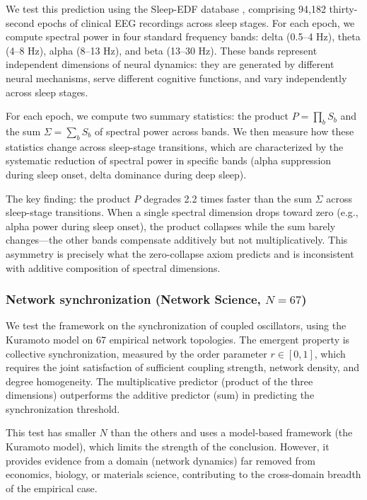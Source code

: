 \documentclass[12pt, a4paper]{article}
\theoremstyle{definition}
\theoremstyle{remark}
\begin{document}
We test this prediction using the Sleep-EDF database \cite{goldberger2000}, comprising 94,182 thirty-second epochs of clinical EEG recordings across sleep stages. For each epoch, we compute spectral power in four standard frequency bands: delta (0.5--4 Hz), theta (4--8 Hz), alpha (8--13 Hz), and beta (13--30 Hz). These bands represent independent dimensions of neural dynamics: they are generated by different neural mechanisms, serve different cognitive functions, and vary independently across sleep stages.

For each epoch, we compute two summary statistics: the product $P = \prod_{b} S_b$ and the sum $\Sigma = \sum_{b} S_b$ of spectral power across bands. We then measure how these statistics change across sleep-stage transitions, which are characterized by the systematic reduction of spectral power in specific bands (alpha suppression during sleep onset, delta dominance during deep sleep).

The key finding: the product $P$ degrades 2.2 times faster than the sum $\Sigma$ across sleep-stage transitions. When a single spectral dimension drops toward zero (e.g., alpha power during sleep onset), the product collapses while the sum barely changes---the other bands compensate additively but not multiplicatively. This asymmetry is precisely what the zero-collapse axiom predicts and is inconsistent with additive composition of spectral dimensions.

\subsubsection{Network synchronization (Network Science, $N = 67$)}

We test the framework on the synchronization of coupled oscillators, using the Kuramoto model on 67 empirical network topologies. The emergent property is collective synchronization, measured by the order parameter $r \in [0, 1]$, which requires the joint satisfaction of sufficient coupling strength, network density, and degree homogeneity. The multiplicative predictor (product of the three dimensions) outperforms the additive predictor (sum) in predicting the synchronization threshold.

This test has smaller $N$ than the others and uses a model-based framework (the Kuramoto model), which limits the strength of the conclusion. However, it provides evidence from a domain (network dynamics) far removed from economics, biology, or materials science, contributing to the cross-domain breadth of the empirical case.
\end{document}
